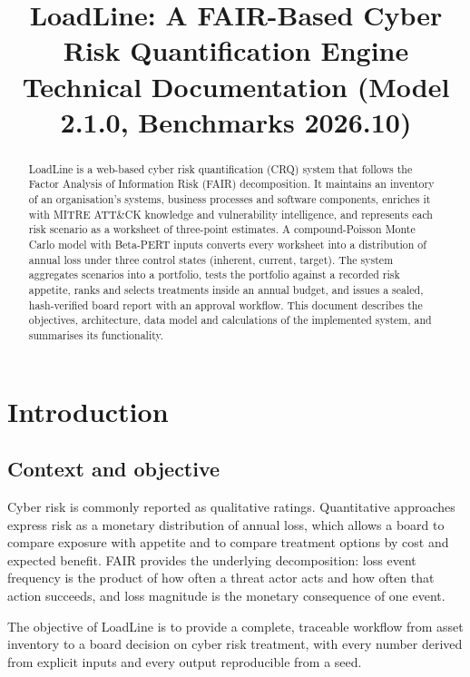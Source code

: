 \documentclass[11pt,a4paper]{article}
\title{\textbf{LoadLine: A FAIR-Based Cyber Risk Quantification Engine}\\[4pt]
\large Technical Documentation (Model 2.1.0, Benchmarks 2026.10)}
\author{}
\date{}
\begin{document}
\maketitle

\begin{abstract}
LoadLine is a web-based cyber risk quantification (CRQ) system that follows the Factor Analysis of Information Risk (FAIR) decomposition. It maintains an inventory of an organisation's systems, business processes and software components, enriches it with MITRE ATT\&CK knowledge and vulnerability intelligence, and represents each risk scenario as a worksheet of three-point estimates. A compound-Poisson Monte Carlo model with Beta-PERT inputs converts every worksheet into a distribution of annual loss under three control states (inherent, current, target). The system aggregates scenarios into a portfolio, tests the portfolio against a recorded risk appetite, ranks and selects treatments inside an annual budget, and issues a sealed, hash-verified board report with an approval workflow. This document describes the objectives, architecture, data model and calculations of the implemented system, and summarises its functionality.
\end{abstract}

\tableofcontents
\newpage

\section{Introduction}

\subsection{Context and objective}
Cyber risk is commonly reported as qualitative ratings. Quantitative approaches express risk as a monetary distribution of annual loss, which allows a board to compare exposure with appetite and to compare treatment options by cost and expected benefit. FAIR provides the underlying decomposition: loss event frequency is the product of how often a threat actor acts and how often that action succeeds, and loss magnitude is the monetary consequence of one event.

The objective of LoadLine is to provide a complete, traceable workflow from asset inventory to a board decision on cyber risk treatment, with every number derived from explicit inputs and every output reproducible from a seed.
\end{document}
